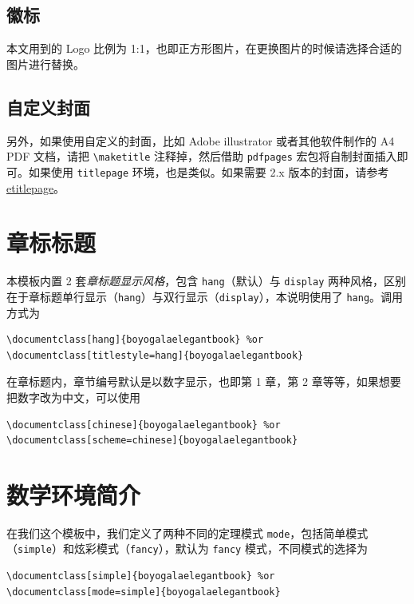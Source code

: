 \documentclass[lang=cn,10pt,scheme=chinese]{boyogalaelegantbook}
\begin{document}
\subsection{徽标}

本文用到的 Logo 比例为 1:1，也即正方形图片，在更换图片的时候请选择合适的图片进行替换。

\subsection{自定义封面}

另外，如果使用自定义的封面，比如 Adobe illustrator 或者其他软件制作的 A4 PDF 文档，请把 \lstinline{\maketitle} 注释掉，然后借助 \lstinline{pdfpages} 宏包将自制封面插入即可。如果使用 \lstinline{titlepage} 环境，也是类似。如果需要 2.x 版本的封面，请参考 \href{https://github.com/EthanDeng/etitlepage}{etitlepage}。

\section{章标标题}

本模板内置 2 套\textit{章标题显示风格}，包含 \lstinline{hang}（默认）与 \lstinline{display} 两种风格，区别在于章标题单行显示（\lstinline{hang}）与双行显示（\lstinline{display}），本说明使用了 \lstinline{hang}。调用方式为
\begin{lstlisting}
\documentclass[hang]{boyogalaelegantbook} %or
\documentclass[titlestyle=hang]{boyogalaelegantbook}
\end{lstlisting}

在章标题内，章节编号默认是以数字显示，也即{\kaishu 第 1 章}，{\kaishu 第 2 章}等等，如果想要把数字改为中文，可以使用
\begin{lstlisting}
\documentclass[chinese]{boyogalaelegantbook} %or
\documentclass[scheme=chinese]{boyogalaelegantbook}
\end{lstlisting}

\section{数学环境简介}

在我们这个模板中，我们定义了两种不同的定理模式 \lstinline{mode}，包括简单模式（\lstinline{simple}）和炫彩模式（\lstinline{fancy}），默认为 \lstinline{fancy} 模式，不同模式的选择为
\begin{lstlisting}
\documentclass[simple]{boyogalaelegantbook} %or
\documentclass[mode=simple]{boyogalaelegantbook}
\end{lstlisting}
\end{document}

